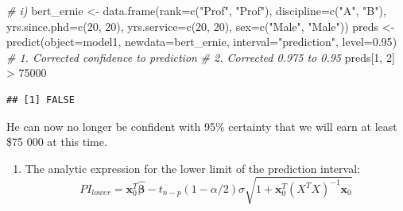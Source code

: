 \documentclass[
]{article}
\newenvironment{Shaded}{\begin{snugshade}}{\end{snugshade}}
\newcommand{\AttributeTok}[1]{\textcolor[rgb]{0.77,0.63,0.00}{#1}}
\newcommand{\CommentTok}[1]{\textcolor[rgb]{0.56,0.35,0.01}{\textit{#1}}}
\newcommand{\DecValTok}[1]{\textcolor[rgb]{0.00,0.00,0.81}{#1}}
\newcommand{\FloatTok}[1]{\textcolor[rgb]{0.00,0.00,0.81}{#1}}
\newcommand{\FunctionTok}[1]{\textcolor[rgb]{0.00,0.00,0.00}{#1}}
\newcommand{\NormalTok}[1]{#1}
\newcommand{\OtherTok}[1]{\textcolor[rgb]{0.56,0.35,0.01}{#1}}
\newcommand{\SpecialCharTok}[1]{\textcolor[rgb]{0.00,0.00,0.00}{#1}}
\newcommand{\StringTok}[1]{\textcolor[rgb]{0.31,0.60,0.02}{#1}}
\providecommand{\tightlist}{%
  \setlength{\itemsep}{0pt}\setlength{\parskip}{0pt}}
\begin{document}
\begin{Shaded}
\begin{Highlighting}[]
\CommentTok{\# i)}
\NormalTok{bert\_ernie }\OtherTok{\textless{}{-}} \FunctionTok{data.frame}\NormalTok{(}\AttributeTok{rank=}\FunctionTok{c}\NormalTok{(}\StringTok{"Prof"}\NormalTok{, }\StringTok{"Prof"}\NormalTok{), }\AttributeTok{discipline=}\FunctionTok{c}\NormalTok{(}\StringTok{"A"}\NormalTok{, }\StringTok{"B"}\NormalTok{), }
                         \AttributeTok{yrs.since.phd=}\FunctionTok{c}\NormalTok{(}\DecValTok{20}\NormalTok{, }\DecValTok{20}\NormalTok{), }\AttributeTok{yrs.service=}\FunctionTok{c}\NormalTok{(}\DecValTok{20}\NormalTok{, }\DecValTok{20}\NormalTok{), }
                         \AttributeTok{sex=}\FunctionTok{c}\NormalTok{(}\StringTok{"Male"}\NormalTok{, }\StringTok{"Male"}\NormalTok{))}
\NormalTok{preds }\OtherTok{\textless{}{-}} \FunctionTok{predict}\NormalTok{(}\AttributeTok{object=}\NormalTok{model1, }\AttributeTok{newdata=}\NormalTok{bert\_ernie, }\AttributeTok{interval=}\StringTok{"prediction"}\NormalTok{, }\AttributeTok{level=}\FloatTok{0.95}\NormalTok{) }
\CommentTok{\# 1. Corrected confidence to prediction}
\CommentTok{\# 2. Corrected 0.975 to 0.95}
\NormalTok{preds[}\DecValTok{1}\NormalTok{, }\DecValTok{2}\NormalTok{] }\SpecialCharTok{\textgreater{}} \DecValTok{75000}
\end{Highlighting}
\end{Shaded}

\begin{verbatim}
## [1] FALSE
\end{verbatim}

He can now no longer be confident with 95\% certainty that we will earn
at least \$75 000 at this time.

\begin{enumerate}
\def\labelenumi{\roman{enumi})}
\setcounter{enumi}{1}
\tightlist
\item
  The analytic expression for the lower limit of the prediction
  interval: \[
  PI_{lower} = \boldsymbol{x}_0^T \hat{\boldsymbol{\beta}} - t_{n-p} (1-\alpha/2) \hat{\sigma} \sqrt{1+ \boldsymbol{x}_0^T (X^TX)^{-1} \boldsymbol{x}_0}
  \]
\end{enumerate}
\end{document}
